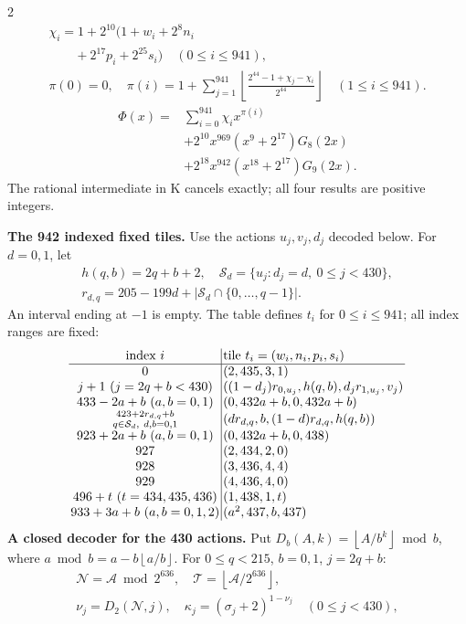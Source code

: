 \documentclass[10pt]{article}
\newcommand{\fl}[1]{\left\lfloor#1\right\rfloor}
\newcommand{\rg}[2]{\{#1,\ldots,#2\}}
\begin{document}
\begin{multicols}{2}
\[\begin{gathered}
\chi_i=1+2^{10}(1+w_i+2^8n_i\\
\qquad+2^{17}p_i+2^{25}s_i)\quad(0\le i\le941),\\
\pi(0)=0,\quad\pi(i)=1+\sum_{j=1}^{941}
\fl{\frac{2^{44}-1+\chi_j-\chi_i}{2^{44}}}\quad(1\le i\le941).
\end{gathered}
\]
\[
\begin{split}
\Phi(x)={}&\sum_{i=0}^{941}\chi_i x^{\pi(i)}\\
&+2^{10}x^{969}(x^9+2^{17})G_8(2x)\\
&+2^{18}x^{942}(x^{18}+2^{17})G_9(2x).
\end{split}
\]
The rational intermediate in K cancels exactly; all four results are positive integers.

\textbf{The 942 indexed fixed tiles.}
Use the actions $u_j,v_j,d_j$ decoded below. For $d=0,1$, let
\[
\begin{gathered}
h(q,b)=2q+b+2,\quad
\mathcal S_d=\{u_j:d_j=d,\ 0\le j<430\},\\
r_{d,q}=205-199d+|\mathcal S_d\cap\rg0{q-1}|.
\end{gathered}
\]
An interval ending at $-1$ is empty. The table defines $t_i$ for
$0\le i\le941$; all index ranges are fixed:
\[
\setlength{\arraycolsep}{1.4pt}\begin{array}{c|l}
\text{index }i&\text{tile }t_i=(w_i,n_i,p_i,s_i)\\\hline
0&(2,435,3,1)\\
j+1\ (j=2q+b<430)&((1-d_j)r_{0,u_j},h(q,b),d_jr_{1,u_j},v_j)\\
433-2a+b\ (a,b=0,1)&(0,432a+b,0,432a+b)\\
\substack{423+2r_{d,q}+b\\q\in\mathcal S_d,\ d,b=0,1}&(dr_{d,q},b,(1-d)r_{d,q},h(q,b))\\
923+2a+b\ (a,b=0,1)&(0,432a+b,0,438)\\
927&(2,434,2,0)\\
928&(3,436,4,4)\\
929&(4,436,4,0)\\
496+t\ (t=434,435,436)&(1,438,1,t)\\
933+3a+b\ (a,b=0,1,2)&(a^2,437,b,437)
\end{array}
\]
\textbf{A closed decoder for the 430 actions.}
Put $D_b(A,k)=\fl{A/b^k}\bmod b$, where
$a\bmod b=a-b\fl{a/b}$. For $0\le q<215$, $b=0,1$, $j=2q+b$:
\[
\begin{gathered}
\mathcal N=\mathcal A\bmod2^{636},\quad
\mathcal T=\fl{\mathcal A/2^{636}},\\
\nu_j=D_2(\mathcal N,j),\quad \kappa_j=(\sigma_j+2)^{1-\nu_j}\quad(0\le j<430),\\

\end{gathered}\]
\end{multicols}
\end{document}
